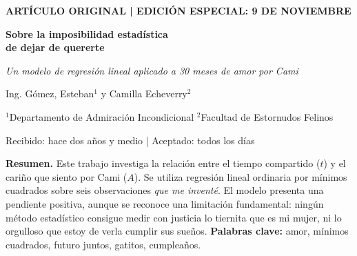 \documentclass[10pt,letterpaper]{article}
\begin{document}
\begin{center}
{\small\bfseries\color{accent} ARTÍCULO ORIGINAL \; | \; EDICIÓN ESPECIAL: 9 DE NOVIEMBRE}\par
\vspace{5pt}
{\LARGE\bfseries\color{ink} Sobre la imposibilidad estadística\\ de dejar de quererte}\par
\vspace{5pt}
{\large\itshape Un modelo de regresión lineal aplicado a 30 meses de amor por Cami}\par
\vspace{7pt}
{\normalsize Ing. Gómez, Esteban$^{1}$ \quad y \quad Camilla Echeverry$^{2}$}\par
{\small\color{muted} $^1$Departamento de Admiración Incondicional \quad $^2$Facultad de Estornudos Felinos}\par
{\footnotesize Recibido: hace dos años y medio \quad | \quad Aceptado: todos los días}\par
\end{center}
\vspace{3pt}
\noindent\colorbox{accent!7}{\begin{minipage}{\dimexpr\linewidth-2\fboxsep\relax}
\small\textbf{Resumen.} Este trabajo investiga la relación entre el tiempo compartido ($t$) y el cariño que siento por Cami ($A$). Se utiliza regresión lineal ordinaria por mínimos cuadrados sobre seis observaciones \emph{que me inventé}. El modelo presenta una pendiente positiva, aunque se reconoce una limitación fundamental: ningún método estadístico consigue medir con justicia lo tiernita que es mi mujer, ni lo orgulloso que estoy de verla cumplir sus sueños. \textbf{Palabras clave:} amor, mínimos cuadrados, futuro juntos, gatitos, cumpleaños.
\end{minipage}}
\setlength{\multicolsep}{6pt}
\small
\end{document}
